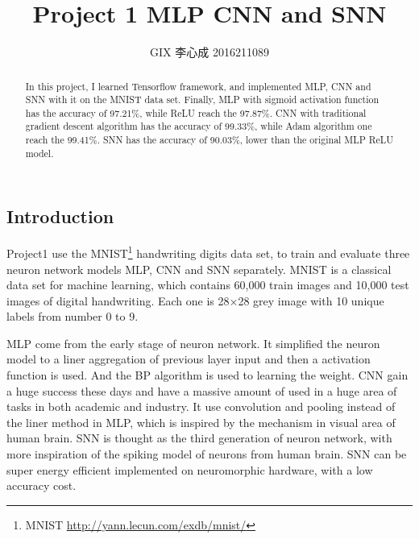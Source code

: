 \documentclass[10pt,twocolumn,letterpaper]{article}
\begin{document}
\begin{CJK}{UTF8}{gbsn}

\title{Project 1 MLP CNN and SNN}

\author{GIX 李心成 2016211089
}

\maketitle

\begin{abstract}
In this project, I learned Tensorflow framework, and implemented MLP, CNN and SNN with it on the MNIST data set. Finally, MLP with sigmoid activation function has the accuracy of 97.21\%, while ReLU reach the 97.87\%. CNN with traditional gradient descent algorithm has the accuracy of 99.33\%, while Adam algorithm one reach the 99.41\%. SNN has the accuracy of 90.03\%, lower than the original MLP ReLU model.
\end{abstract}

\section{Introduction}

Project1 use the MNIST\footnote {MNIST \url{http://yann.lecun.com/exdb/mnist/}}  handwriting digits data set, to train and evaluate three neuron network models MLP, CNN and SNN separately. MNIST is a classical data set for machine learning, which contains 60,000 train images and 10,000 test images of digital handwriting. Each one is 28×28 grey image with 10 unique labels from number 0 to 9.

MLP come from the early stage of neuron network. It simplified the neuron model to a liner aggregation of previous layer input and then a activation function is used. And the BP algorithm is used to learning the weight. CNN gain a huge success these days and have a massive amount of used in a huge area of tasks in both academic and industry. It use convolution and pooling instead of the liner method in MLP, which is inspired by the mechanism in visual area of human brain. SNN is thought as the third generation of neuron network, with more inspiration of the spiking model of neurons from human brain. SNN can be super energy efficient implemented on neuromorphic hardware, with a low accuracy cost. 


\end{CJK}
\end{document}
